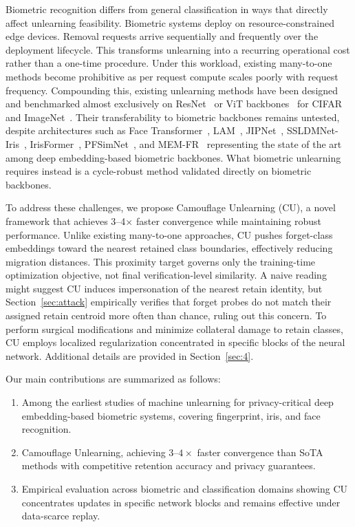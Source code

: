 Biometric recognition differs from general classification in ways that directly affect unlearning feasibility. Biometric systems deploy on resource-constrained edge devices. Removal requests arrive sequentially and frequently over the deployment lifecycle. This transforms unlearning into a recurring operational cost rather than a one-time procedure. Under this workload, existing many-to-one methods become prohibitive as per request compute scales poorly with request frequency. Compounding this, existing unlearning methods have been designed and benchmarked almost exclusively on ResNet~\cite{he2016deep} or ViT backbones~\cite{dosovitskiy2020image} for CIFAR~\cite{krizhevsky2009learning} and ImageNet~\cite{russakovsky2015imagenet}. Their transferability to biometric backbones remains untested, despite architectures such as Face Transformer~\cite{zhong2021face}, LAM~\cite{luo2025novel}, JIPNet~\cite{guan2024joint}, SSLDMNet-Iris~\cite{kadhim2025deep}, IrisFormer~\cite{sun2024irisformer}, PFSimNet~\cite{yu2024partial}, and MEM-FR~\cite{wu2025privacy} representing the state of the art among deep embedding-based biometric backbones. What biometric unlearning requires instead is a cycle-robust method validated directly on biometric backbones.

To address these challenges, we propose Camouflage Unlearning (CU), a novel framework that achieves 3--4$\times$ faster convergence while maintaining robust performance. Unlike existing many-to-one approaches, CU pushes forget-class embeddings toward the nearest retained class boundaries, effectively reducing migration distances. This proximity target governs only the training-time optimization objective, not final verification-level similarity. A naive reading might suggest CU induces impersonation of the nearest retain identity, but Section~\ref{sec:attack} empirically verifies that forget probes do not match their assigned retain centroid more often than chance, ruling out this concern. To perform surgical modifications and minimize collateral damage to retain classes, CU employs localized regularization concentrated in specific blocks of the neural network. Additional details are provided in Section~\ref{sec:4}.

Our main contributions are summarized as follows:
\begin{enumerate}
    \item Among the earliest studies of machine unlearning for privacy-critical deep embedding-based biometric systems, covering fingerprint, iris, and face recognition.
    \item Camouflage Unlearning, achieving $3$--$4\times$ faster convergence than SoTA methods with competitive retention accuracy and privacy guarantees.
    \item Empirical evaluation across biometric and classification domains showing CU concentrates updates in specific network blocks and remains effective under data-scarce replay.
\end{enumerate}
